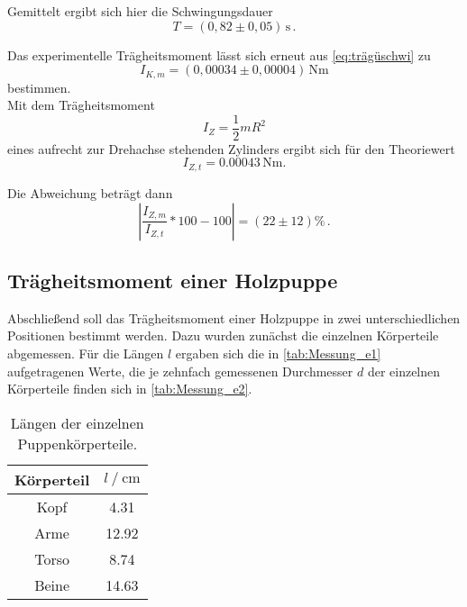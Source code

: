 Gemittelt ergibt sich hier die Schwingungsdauer
\begin{equation*}
  T = (0,82 \pm 0,05) \, \unit{\second} \,.
\end{equation*}

Das experimentelle Trägheitsmoment lässt sich erneut aus \eqref{eq:trägüschwi} zu
\begin{equation*}
  I_{K,m} = (0,00034 \pm 0,00004) \, \unit{\newton\meter}
\end{equation*} 
bestimmen. \\

Mit dem Trägheitsmoment
\begin{equation}
  I_Z = \frac{1}{2} m R^2
\end{equation}
eines aufrecht zur Drehachse stehenden Zylinders ergibt sich für den Theoriewert
\begin{equation*}
  I_{Z,t} = 0.00043 \,  \unit{\newton\meter}.
\end{equation*}

Die Abweichung beträgt dann
\begin{equation*}
  \left|\frac{I_{Z,m}}{I_{Z,t}} * 100 - 100 \right| = (22 \pm 12) \% \,.
\end{equation*}

\subsection{Trägheitsmoment einer Holzpuppe}
\label{subsec:e}

Abschließend soll das Trägheitsmoment einer Holzpuppe in zwei unterschiedlichen Positionen bestimmt werden. Dazu wurden zunächst die einzelnen Körperteile abgemessen.
Für die Längen $l$ ergaben sich die in \autoref{tab:Messung_e1} aufgetragenen Werte, die je zehnfach gemessenen Durchmesser $d$ der einzelnen Körperteile finden sich in \autoref{tab:Messung_e2}.

\begin{table}[H]
  \centering
  \begin{tabular}{S[table-format=2.0] S[table-format=2.2]}
      \toprule
      {Körperteil} & {$l \mathbin{/} \unit{\centi\meter}$}\\
      \midrule
        {Kopf}  & 4.31  \\
        {Arme}  & 12.92 \\
        {Torso} & 8.74 \\
        {Beine} & 14.63 \\
      \bottomrule
  \end{tabular}
  \caption{Längen der einzelnen Puppenkörperteile.}
  \label{tab:Messung_e1}
\end{table}

